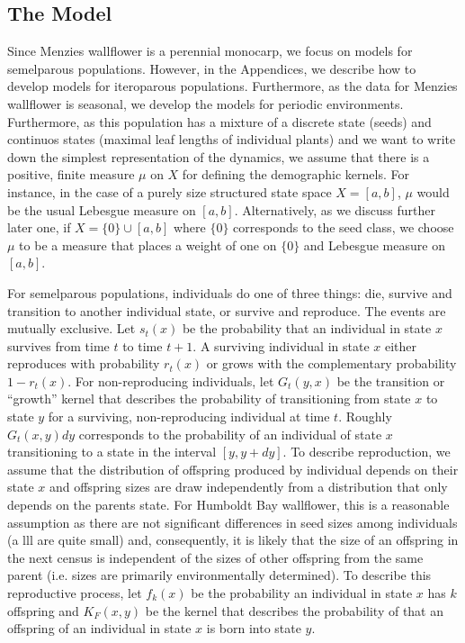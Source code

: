 \documentclass{amsart}
\begin{document}
\subsection*{The Model}
Since  Menzies wallflower is a perennial monocarp, we focus on models for semelparous populations. However, in the Appendices, we describe how to develop models for iteroparous populations. Furthermore, as the data for Menzies wallflower is seasonal, we develop the models for periodic environments. Furthermore, as this population has a mixture of a discrete state (seeds) and continuos states (maximal leaf lengths of individual plants) and we want to write down the simplest representation of the dynamics, we assume that there is a positive, finite measure $\mu$ on $X$ for defining the demographic kernels. For instance, in the case of a purely size structured state space $X=[a,b]$, $\mu$ would be the usual Lebesgue measure on $[a,b]$. Alternatively, as we discuss further later one, if $X=\{0\} \cup [a,b]$ where $\{0\}$ corresponds to the seed class, we choose $\mu$ to be a measure that places a weight of one on $\{0\}$  and Lebesgue measure on $[a,b]$.


For semelparous populations,  individuals do one of three things: die,  survive and transition to another individual state, or survive and reproduce. The events are mutually exclusive. Let $s_t(x)$ be the probability that an individual in state $x$ survives from time $t$ to time $t+1$. A surviving individual in state $x$ either reproduces with probability $r_t(x)$ or grows with the complementary probability $1-r_t(x)$. For non-reproducing individuals, let $G_t(y,x)$ be the transition or ``growth'' kernel that describes the probability of transitioning from state $x$ to state $y$ for a surviving, non-reproducing individual at time $t$. Roughly $G_t(x,y)dy$ corresponds to the probability of an individual of state $x$ transitioning to a state in the interval $[y,y+dy]$. To describe reproduction, we assume that the distribution of offspring produced by individual depends on their state $x$ and offspring sizes are draw independently from a distribution that only depends on the parents state. For Humboldt Bay wallflower, this is a reasonable assumption as there are not significant differences in seed sizes among individuals (a lll are quite small) and, consequently, it is likely that the size of an offspring in the next census is independent of the sizes of other offspring from the same parent (i.e. sizes are primarily environmentally determined). To describe this reproductive process, let $f_k(x)$ be the probability an individual in state $x$ has $k$ offspring and $K_F(x,y)$ be the kernel that describes the probability of that an offspring of an individual in state $x$ is born into state $y$.  
\end{document}
